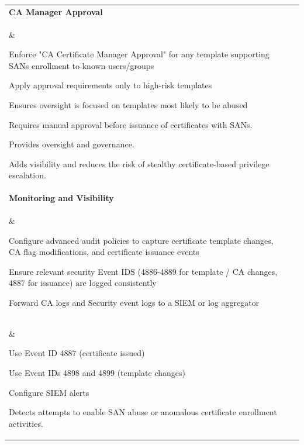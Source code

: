 {\begin{table}[htbp]
\begin{tabular}{|p{3.5cm}|p{6cm}|p{6cm}|}
\textbf{CA Manager Approval} \\\& 
\begin{compactitem}
    \item Enforce "CA Certificate Manager Approval" for any template supporting SANs enrollment to known users/groups
    \item Apply approval requirements only to high-risk templates
    \item Ensures oversight is focused on templates most likely to be abused
\end{compactitem}

    \item Requires manual approval before issuance of certificates with SANs.
    \item Provides oversight and governance.
\begin{compactitem}
    \item Adds visibility and reduces the risk of stealthy certificate-based privilege escalation.
\end{compactitem} \\
\hline

\textbf{Monitoring and Visibility} \\\& 
\begin{compactitem}
    \item Configure advanced audit policies to capture certificate template changes, CA flag modifications, and certificate issuance events
    \item Ensure relevant security Event IDS (4886-4889 for template / CA changes, 4887 for issuance) are logged consistently
    \item Forward CA logs and Security event logs to a SIEM or log aggregator
\end{compactitem} \\\& 
\begin{compactitem}
    \item Use Event ID 4887 (certificate issued)
    \item Use Event IDs 4898 and 4899 (template changes)
    \item Configure SIEM alerts
\end{compactitem} 
\begin{compactitem}
    \item Detects attempts to enable SAN abuse or anomalous certificate enrollment activities.
\end{compactitem} \\
\hline


\end{tabular}
\end{table}}
